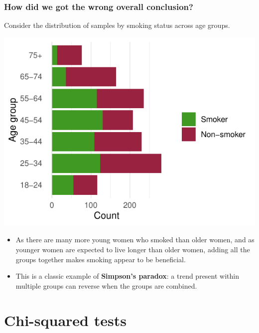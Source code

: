\documentclass[a4paper]{article}\usepackage[]{graphicx}\usepackage[]{xcolor}
\makeatletter
\def\maxwidth{ %
  \ifdim\Gin@nat@width>\linewidth
    \linewidth
  \else
    \Gin@nat@width
  \fi
}
\makeatother
\begin{document}
\subsubsection{How did we got the wrong overall conclusion?}
Consider the distribution of samples by smoking status across age groups.
\begin{Schunk}


{\centering \includegraphics[width=\maxwidth]{figure/listings-unnamed-chunk-14-1} 

}

\end{Schunk}
\begin{itemize}
	\item As there are many more young women who smoked than older women, and as younger women are expected to live longer than older women, adding all the groups together makes smoking appear to be beneficial.
	\item This is a classic example of \textbf{Simpson's paradox}: a trend present within multiple groups can reverse when the groups are combined.
\end{itemize}
\section{Chi-squared tests}\label{sec:3}
\end{document}
